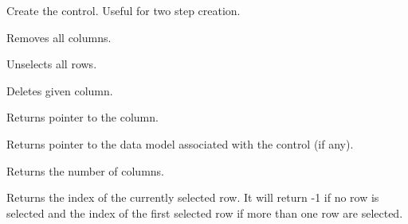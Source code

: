 
Create the control. Useful for two step creation.

\label{wxdataviewctrlclearcolumns}


Removes all columns.

\label{wxdataviewctrlclearselection}


Unselects all rows.

\label{wxdataviewctrldeletecolumn}


Deletes given column.

\label{wxdataviewctrlgetcolumn}


Returns pointer to the column.

\label{wxdataviewctrlgetmodel}


Returns pointer to the data model associated with the
control (if any).

\label{wxdataviewctrlgetnumberofcolumns}


Returns the number of columns.

\label{wxdataviewctrlgetselection}


Returns the index of the currently selected row. It will 
return -1 if no row is selected and the index of the first
selected row if more than one row are selected.

\label{wxdataviewctrlgetselections}

